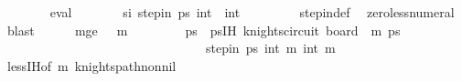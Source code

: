 \begin{isabellebody}
\ \ \ \ \ \ \isamarkupfalse%
\ eval{\isacharplus}{\kern0pt}\isanewline
\ \ \ \ \isamarkupfalse%
\ \isamarkupfalse%
\ si{\isacharcolon}{\kern0pt}\ {\isachardoublequoteopen}step{\isacharunderscore}{\kern0pt}in\ {\isacharquery}{\kern0pt}ps\ {\isacharparenleft}{\kern0pt}{}{\isacharcomma}{\kern0pt}int\ {}{\isacharminus}{\kern0pt}{}{\isacharparenright}{\kern0pt}\ {\isacharparenleft}{\kern0pt}{}{\isacharcomma}{\kern0pt}int\ {}{\isacharparenright}{\kern0pt}{\isachardoublequoteclose}\isanewline
\ \ \ \ \ \ \isamarkupfalse%
\ step{\isacharunderscore}{\kern0pt}in{\isacharunderscore}{\kern0pt}def\ \isamarkupfalse%
\ zero{\isacharunderscore}{\kern0pt}less{\isacharunderscore}{\kern0pt}numeral\ \isamarkupfalse%
\ blast\isanewline
\ \ \ \ \isamarkupfalse%
\ m{\isacharunderscore}{\kern0pt}ge{\isacharcolon}{\kern0pt}\ {\isachardoublequoteopen}{}\ {\isasymle}\ m{\isacharminus}{\kern0pt}{}{\isachardoublequoteclose}\ \isanewline
\ \ \ \ \isamarkupfalse%
\ \isamarkupfalse%
\ ps\ \ psIH{\isacharcolon}{\kern0pt}\ {\isachardoublequoteopen}knights{\isacharunderscore}{\kern0pt}circuit\ {\isacharparenleft}{\kern0pt}board\ {}\ {\isacharparenleft}{\kern0pt}m{\isacharminus}{\kern0pt}{}{\isacharparenright}{\kern0pt}{\isacharparenright}{\kern0pt}\ ps\isanewline
\ \ \ \ \ \ \ \ \ \ \ \ \ \ \ \ \ \ \ \ \ \ \ \ \ \ \ \ \ \ \ \ {\isachardoublequoteopen}step{\isacharunderscore}{\kern0pt}in\ ps\ {\isacharparenleft}{\kern0pt}{}{\isacharcomma}{\kern0pt}int\ {\isacharparenleft}{\kern0pt}m{\isacharminus}{\kern0pt}{}{\isacharparenright}{\kern0pt}{\isacharminus}{\kern0pt}{}{\isacharparenright}{\kern0pt}\ {\isacharparenleft}{\kern0pt}{}{\isacharcomma}{\kern0pt}int\ {\isacharparenleft}{\kern0pt}m{\isacharminus}{\kern0pt}{}{\isacharparenright}{\kern0pt}{\isacharparenright}{\kern0pt}{\isachardoublequoteclose}\isanewline
\ \ \ \ \ \ \isamarkupfalse%
\ less{\isachardot}{\kern0pt}IH{\isacharbrackleft}{\kern0pt}of\ {\isachardoublequoteopen}m{\isacharminus}{\kern0pt}{}{\isachardoublequoteclose}{\isacharbrackright}{\kern0pt}\ knights{\isacharunderscore}{\kern0pt}path{\isacharunderscore}{\kern0pt}non{\isacharunderscore}{\kern0pt}nil\ \isamarkupfalse%

\end{isabellebody}
